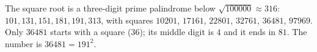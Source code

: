 The square root is a three-digit prime palindrome below $\sqrt{100000}\approx316$: $101,131,151,181,191,313$, with squares $10201$, $17161$, $22801$, $32761$, $36481$, $97969$. Only $36481$ starts with a square ($36$); its middle digit is $4$ and it ends in $81$. The number is $\boxed{36481}=191^2$.
